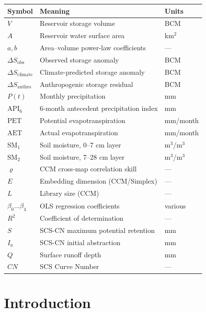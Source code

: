 \documentclass[12pt,a4paper,oneside]{report}
\newcommand{\dSobs}{\Delta S_{\mathrm{obs}}}
\newcommand{\dSclim}{\Delta S_{\mathrm{climate}}}
\newcommand{\dSanthro}{\Delta S_{\mathrm{anthro}}}
\begin{document}
\begin{longtable}{lll}
  \toprule
  Symbol & Meaning & Units \\
  \midrule
  $V$ & Reservoir storage volume & BCM \\
  $A$ & Reservoir water surface area & km$^2$ \\
  $a, b$ & Area--volume power-law coefficients & --- \\
  $\dSobs$ & Observed storage anomaly & BCM \\
  $\dSclim$ & Climate-predicted storage anomaly & BCM \\
  $\dSanthro$ & Anthropogenic storage residual & BCM \\
  $P(t)$ & Monthly precipitation & mm \\
  $\mathrm{API}_6$ & 6-month antecedent precipitation index & mm \\
  $\mathrm{PET}$ & Potential evapotranspiration & mm/month \\
  $\mathrm{AET}$ & Actual evapotranspiration & mm/month \\
  $\mathrm{SM}_1$ & Soil moisture, 0--7 cm layer & m$^3$/m$^3$ \\
  $\mathrm{SM}_2$ & Soil moisture, 7--28 cm layer & m$^3$/m$^3$ \\
  $\varrho$ & CCM cross-map correlation skill & --- \\
  $E$ & Embedding dimension (CCM/Simplex) & --- \\
  $L$ & Library size (CCM) & --- \\
  $\beta_0 \ldots \beta_4$ & OLS regression coefficients & various \\
  $R^2$ & Coefficient of determination & --- \\
  $S$ & SCS-CN maximum potential retention & mm \\
  $I_a$ & SCS-CN initial abstraction & mm \\
  $Q$ & Surface runoff depth & mm \\
  $CN$ & SCS Curve Number & --- \\
  \bottomrule
\end{longtable}


\chapter{Introduction}
\label{ch:intro}
\end{document}
